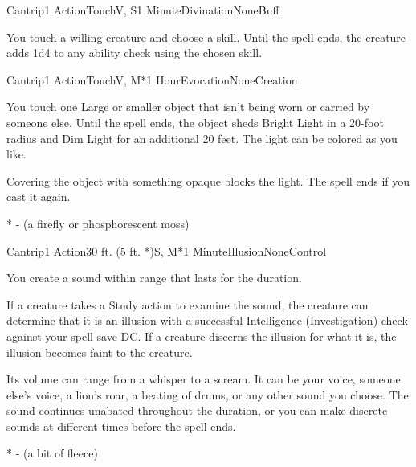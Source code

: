


\pagestyle{empty}


\begin{Spell}{Cantrip}{1 Action}{Touch}{V, S}{1 Minute}{Divination}{None}{Buff}

You touch a willing creature and choose a skill. Until the spell ends, the creature adds 1d4 to any ability check using the chosen skill.

\end{Spell}


\begin{Spell}{Cantrip}{1 Action}{Touch}{V, M*}{1 Hour}{Evocation}{None}{Creation}

You touch one Large or smaller object that isn't being worn or carried by someone else. Until the spell ends, the object sheds Bright Light in a 20-foot radius and Dim Light for an additional 20 feet. The light can be colored as you like.

Covering the object with something opaque blocks the light. The spell ends if you cast it again.

* - (a firefly or phosphorescent moss)

\end{Spell}


\begin{Spell}{Cantrip}{1 Action}{30 ft. (5 ft. *)}{S, M*}{1 Minute}{Illusion}{None}{Control}

You create a sound within range that lasts for the duration.

If a creature takes a Study action to examine the sound, the creature can determine that it is an illusion with a successful Intelligence (Investigation) check against your spell save DC. If a creature discerns the illusion for what it is, the illusion becomes faint to the creature.

Its volume can range from a whisper to a scream. It can be your voice, someone else's voice, a lion's roar, a beating of drums, or any other sound you choose. The sound continues unabated throughout the duration, or you can make discrete sounds at different times before the spell ends.

* - (a bit of fleece)

\end{Spell}

